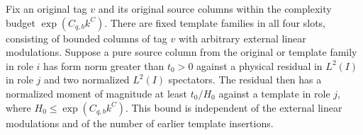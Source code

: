 \begin{lemma}\label{lem:same-tag-test}
Fix an original tag \(v\) and its original source columns within
the complexity budget \(\exp(C_{q,b}k^C)\).
There are fixed template families in
all four slots, consisting of bounded columns of tag \(v\) with
arbitrary external linear modulations.  Suppose a pure source
column from the original or template family in role \(i\) has
form norm greater than \(t_0>0\) against a physical residual in \(L^2(I)\) in
role \(j\) and two normalized \(L^2(I)\) spectators.  The residual
then has a normalized moment of magnitude at least \(t_0/H_0\)
against a template in role \(j\), where
\(H_0\le\exp(C_{q,b}k^C)\).  This bound is independent of the
external linear modulations and of the number of earlier template
insertions.
\end{lemma}
